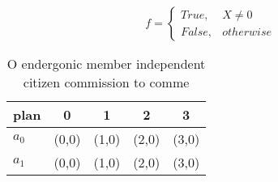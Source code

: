 \documentclass[a4paper]{article}
\begin{document}
\begin{equation}   f =
\begin{cases} True, & X \neq 0\\
False, & otherwise
\end{cases}
\end{equation}

\begin{table}
\begin{adjustbox}{width=0.5\columnwidth}
\begin{tabular}{|l|l|l|l|l|}
\hline
\textbf{plan} & \multicolumn{1}{c|}{\textbf{0}} & \multicolumn{1}{c|}{\textbf{1}} & \multicolumn{1}{c|}{\textbf{2}} & \multicolumn{1}{c|}{\textbf{3}} \\ \hline
\textbf{$a_0$}  & (0,0) & (1,0) & (2,0) & (3,0) \\ \hline
\textbf{$a_1$}  & (0,0) & (1,0) & (2,0) & (3,0) \\ \hline
\end{tabular}
\end{adjustbox}
\caption{O endergonic member independent citizen commission to comme
}
\end{table}
\end{document}
